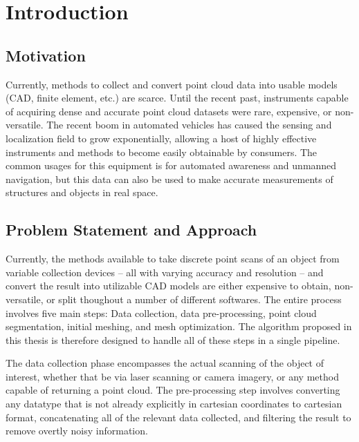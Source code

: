 \documentclass[12pt]{drexelthesis}
\let\Oldsection\section
\renewcommand{\section}{\FloatBarrier\Oldsection}
\begin{document}
\thispagestyle{empty}
\newpage


\setcounter{page}{0}





\chapter{Introduction}
\label{chap:introduction}
\section{Motivation}
Currently, methods to collect and convert point cloud data into usable models (CAD, finite element, etc.) are scarce. Until the recent past, instruments capable of acquiring dense and accurate point cloud datasets were rare, expensive, or non-versatile. The recent boom in automated vehicles has caused the sensing and localization field to grow exponentially, allowing a host of highly effective instruments and methods to become easily obtainable by consumers. The common usages for this equipment is for automated awareness and unmanned navigation, but this data can also be used to make accurate measurements of structures and objects in real space.

\section{Problem Statement and Approach}
Currently, the methods available to take discrete point scans of an object from variable collection devices -- all with varying accuracy and resolution -- and convert the result into utilizable CAD models are either expensive to obtain, non-versatile, or split thoughout a number of different softwares. The entire process involves five main steps: Data collection, data pre-processing, point cloud segmentation, initial meshing, and mesh optimization. The algorithm proposed in this thesis is therefore designed to handle all of these steps in a single pipeline.

The data collection phase encompasses the actual scanning of the object of interest, whether that be via laser scanning or camera imagery, or any method capable of returning a point cloud. The pre-processing step involves converting any datatype that is not already explicitly in cartesian coordinates to cartesian format, concatenating all of the relevant data collected, and filtering the result to remove overtly noisy information.
\end{document}
